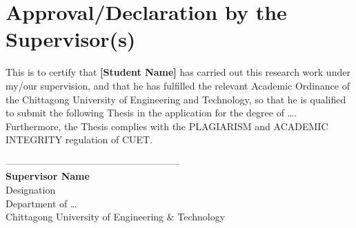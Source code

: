 ﻿\chapter*{Approval/Declaration by the Supervisor(s)}
This is to certify that \textbf{[Student Name]} has carried out this research work under my/our supervision, and that he has fulfilled the relevant Academic Ordinance of the Chittagong University of Engineering and Technology, so that he is qualified to submit the following Thesis in the application for the degree of \dots. Furthermore, the Thesis complies with the PLAGIARISM and ACADEMIC INTEGRITY regulation of CUET.

\vspace{2cm}
\noindent
------------------------------------------------------ \\
\textbf{Supervisor Name} \\
Designation \\
Department of \dots \\
Chittagong University of Engineering \& Technology
